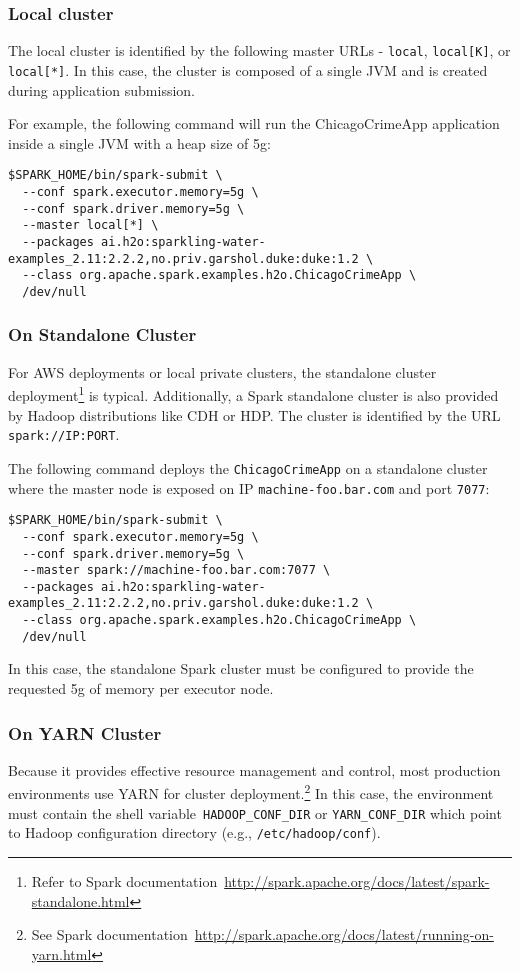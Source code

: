 \subsubsection{Local cluster}
The local cluster is identified by the following master URLs - \texttt{local}, \texttt{local[K]}, or \texttt{local[*]}. In this case, the cluster is composed of a single JVM and is created during application submission.

For example, the following command will run the ChicagoCrimeApp application inside a single JVM with a heap size of 5g:
\begin{lstlisting}[style=Bash]
$SPARK_HOME/bin/spark-submit \ 
  --conf spark.executor.memory=5g \
  --conf spark.driver.memory=5g \
  --master local[*] \
  --packages ai.h2o:sparkling-water-examples_2.11:2.2.2,no.priv.garshol.duke:duke:1.2 \
  --class org.apache.spark.examples.h2o.ChicagoCrimeApp \
  /dev/null
\end{lstlisting}

\subsubsection{On Standalone Cluster}
For AWS deployments or local private clusters, the standalone cluster deployment\footnote{Refer to Spark documentation~\url{http://spark.apache.org/docs/latest/spark-standalone.html}} is typical. Additionally, a Spark standalone cluster is also provided by Hadoop distributions like CDH or HDP. The cluster is identified by the URL \texttt{spark://IP:PORT}.

The following command deploys the \texttt{ChicagoCrimeApp} on a standalone cluster where the master node is exposed on IP \texttt{machine-foo.bar.com} and port \texttt{7077}:

\begin{lstlisting}[style=Bash]
$SPARK_HOME/bin/spark-submit \ 
  --conf spark.executor.memory=5g \
  --conf spark.driver.memory=5g \
  --master spark://machine-foo.bar.com:7077 \
  --packages ai.h2o:sparkling-water-examples_2.11:2.2.2,no.priv.garshol.duke:duke:1.2 \
  --class org.apache.spark.examples.h2o.ChicagoCrimeApp \
  /dev/null
\end{lstlisting}

In this case, the standalone Spark cluster must be configured to provide the requested 5g of memory per executor node. 

\subsubsection{On YARN Cluster}
Because it provides effective resource management and control, most production environments use YARN for cluster deployment.\footnote{See Spark documentation~\url{http://spark.apache.org/docs/latest/running-on-yarn.html}} 
In this case, the environment must contain the shell variable~\texttt{HADOOP\_CONF\_DIR} or \texttt{YARN\_CONF\_DIR} which point to Hadoop configuration directory (e.g., \texttt{/etc/hadoop/conf}).

